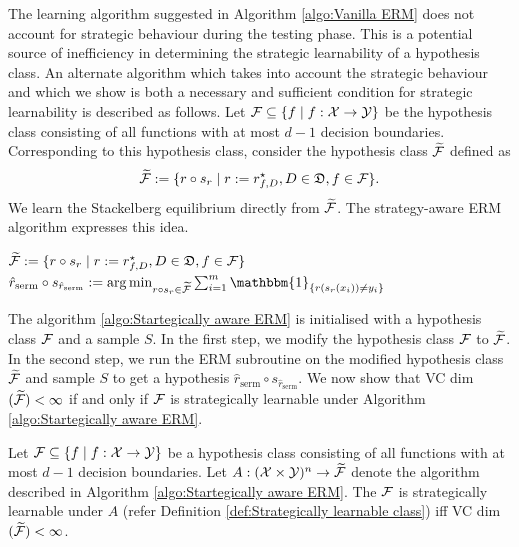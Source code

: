 The learning algorithm suggested in Algorithm \ref{algo:Vanilla ERM} does not account for strategic behaviour during the testing phase. This is a potential source of inefficiency in determining the strategic learnability of a hypothesis class. An alternate algorithm which takes into account the strategic behaviour and which we show is both a necessary and sufficient condition for strategic learnability is described as follows.
Let $\mathcal{F} \subseteq \{f \mid f:\mathcal{X} \rightarrow \mathcal{Y}\}$ be the hypothesis class consisting of all functions with at most $d-1$ decision boundaries. Corresponding to this hypothesis class, consider the hypothesis class $\widetilde{\mathcal{F}}$ defined as
\[
\widetilde{\mathcal{F}} := \{r \circ s_r \mid r := r^\star_{f,D}, D \in \mathfrak{D}, f \in \mathcal{F}\}.
\]
We learn the Stackelberg equilibrium directly from $\widetilde{\mathcal{F}}$. The strategy-aware ERM algorithm expresses this idea.
\begin{center}
	\begin{algorithm}[H]\label{algo:Startegically aware ERM}
		\SetAlgoLined
		\DontPrintSemicolon
		\BlankLine
		$\widetilde{\mathcal{F}} := \{r \circ s_r \mid r := r^\star_{f,D}, D \in \mathfrak{D}, f \in \mathcal{F}\}$  \;
		\BlankLine
		$\hat{r}_{\textrm{serm}}\circ s_{\hat{r}_{\textrm{serm}}}:= \arg\min_{r \circ s_r \in \widetilde{\cg{F}}} \sum_{i=1}^m \mathbbm{1}_{\{r(s_r(x_i)) \neq y_i\}}$ \\
		
		\BlankLine
		
		\caption{Strategy aware ERM algorithm}
	\end{algorithm}
\end{center}
The algorithm \ref{algo:Startegically aware ERM} is initialised with a hypothesis class $\mathcal{F}$ and a sample $S$. In the first step, we modify the hypothesis class $\mathcal{F}$ to $\widetilde{\mathcal{F}}$. In the second step, we run the ERM subroutine on the modified hypothesis class $\widetilde{\mathcal{F}}$ and sample $S$ to get a hypothesis $\hat{r}_{\textrm{serm}}\circ s_{\hat{r}_{\textrm{serm}}}$. We now show that VC dim$(\widetilde{\mathcal{F}}) < \infty$ if and only if $\mathcal{F}$ is strategically learnable under Algorithm \ref{algo:Startegically aware ERM}. 

\begin{thm}\label{thm:Fundamental theorem of strategic learning}
Let $\mathcal{F} \subseteq \{ f \mid f: \mathcal{X} \rightarrow \mathcal{Y} \}$ be a hypothesis class consisting of all functions with at most $d-1$ decision boundaries. Let $A: (\mathcal{X} \times \mathcal{Y})^n \rightarrow \widetilde{\mathcal{F}}$ denote the algorithm described in Algorithm \ref{algo:Startegically aware ERM}.  The $\mathcal{F}$ is strategically learnable under $A$ (refer Definition \ref{def:Strategically learnable class}) iff VC dim$(\widetilde{\mathcal{F}}) < \infty$.
\end{thm}

